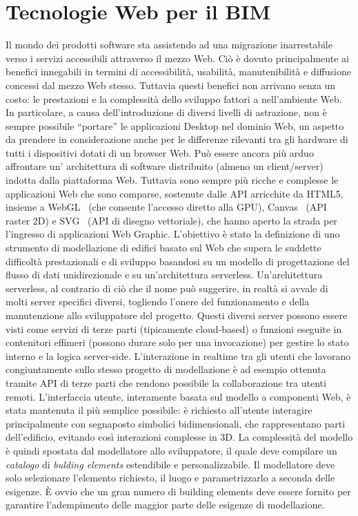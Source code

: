 \section{Tecnologie Web per il BIM}
\label{sec:chapter_1_section_3}

Il mondo dei prodotti software sta assistendo ad una migrazione inarrestabile verso i servizi accessibili
attraverso il mezzo Web. Ciò è dovuto principalmente ai benefici innegabili in termini di accessibilità, usabilità,
manutenibilità e diffusione concessi dal mezzo Web stesso.
Tuttavia questi benefici non arrivano senza un costo: le prestazioni e la complessità dello sviluppo fattori a nell'ambiente Web.
In particolare, a causa dell'introduzione di diversi livelli di astrazione, non è sempre possibile ``portare'' le
applicazioni Desktop nel dominio Web, un aspetto da prendere in considerazione anche per le differenze rilevanti
tra gli hardware di tutti i dispositivi dotati di un browser Web.
Può essere ancora più arduo affrontare un' architettura di software distribuito (almeno un client/server)
indotta dalla piattaforma Web. Tuttavia sono sempre più ricche e complesse le applicazioni Web che sono comparse,
sostenute dalle API arricchite da HTML5, insieme a WebGL~\cite{webgl}
(che consente l'accesso diretto alla GPU), Canvas~\cite{Munro:15:HCC} (API raster 2D) e SVG~\cite{Jackson:11:SVG}
(API di disegno vettoriale), che hanno aperto la strada per l'ingresso di applicazioni Web Graphic.
L'obiettivo è stato la definizione di uno strumento di modellazione di edifici basato sul Web
che supera le suddette difficoltà prestazionali e di sviluppo basandosi su un modello di progettazione del flusso di dati
unidirezionale e su un'architettura serverless.
Un'architettura serverless, al contrario di ciò che il nome può suggerire, in realtà si avvale di molti server specifici
diversi, togliendo l'onere del funzionamento e della manutenzione allo sviluppatore del progetto.
Questi diversi server possono essere visti come servizi di terze parti (tipicamente cloud-based) o funzioni eseguite
in contenitori effimeri (possono durare solo per una invocazione) per gestire lo stato interno e la logica server-side.
L'interazione in realtime tra gli utenti che lavorano congiuntamente sullo stesso progetto di modellazione
è ad esempio ottenuta tramite API di terze parti che rendono possibile la collaborazione tra utenti remoti.
L'interfaccia utente, interamente basata sul modello a componenti Web, è stata mantenuta il più semplice possibile:
è richiesto all'utente interagire principalmente con segnaposto simbolici bidimensionali, che rappresentano parti dell'edificio,
evitando così interazioni complesse in 3D.
La complessità del modello è quindi spostata dal modellatore allo sviluppatore, il quale deve compilare un \emph{catalogo} di
\emph{bulding elements} estendibile e personalizzabile. Il modellatore deve solo selezionare l'elemento richiesto,
il luogo e parametrizzarlo a seconda delle esigenze. È ovvio che un gran numero di building elements deve essere fornito
per garantire l'adempimento delle maggior parte delle esigenze di modellazione.\\
